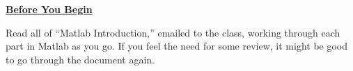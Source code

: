 \documentclass[10pt,reqno]{amsart}
\theoremstyle{plain}
\theoremstyle{definition}
\theoremstyle{remark}
\numberwithin{figure}{section}   %
\begin{document}
% 
% 




 



\bigskip

\noindent\underline{\textbf{Before You Begin}}

Read all of ``Matlab Introduction,'' emailed to the class, working through each part in Matlab as you go.  If you feel the need for some review, it might be good to go through the document again.  
\end{document}
